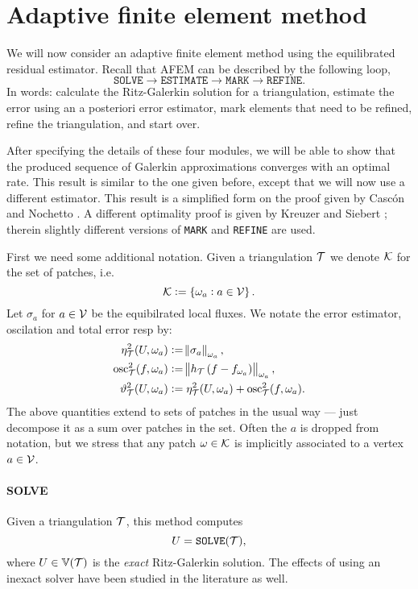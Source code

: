 \documentclass[thesis.tex]{subfiles}
\begin{document}
\section{Adaptive finite element method}
We will now consider an adaptive finite element method using the equilibrated residual estimator.
Recall that AFEM can be described by the following loop,
\[
  \texttt{SOLVE} \to \texttt{ESTIMATE} \to \texttt{MARK} \to \texttt{REFINE}.
\]
In words: calculate the Ritz-Galerkin solution for a triangulation, estimate
the error using an a posteriori error estimator, mark elements that need to be refined, refine
the triangulation, and start over. 

After specifying the details of these four modules, we will be able to show that the produced
sequence of Galerkin approximations converges with an optimal rate. This result
is similar to the one given before, except that we will now use a different estimator. This
result is a simplified form on the proof given by Casc\'on and Nochetto \cite{cascon2012}.
A different optimality proof is given by Kreuzer and Siebert \cite{ainsworthbernstein}; therein
slightly different versions of \texttt{MARK} and \texttt{REFINE} are used.

First we need some additional notation. Given a triangulation $\mathcal{T}$ we denote $\mathcal{K}$ for the set of patches, i.e.
\[
  \mathcal{K} := \set{\omega_a : a \in \mathcal{V}}.
\]
Let $\sigma_a$ for $a \in \mathcal{V}$ be the equibilrated local fluxes. We notate the
  error estimator, oscilation and total error resp by:
\begin{align*}
  \eta^2_{\mathcal{T}}(U, \omega_a) &:= \norm{\sigma_a}_{\omega_a}, \\
  \operatorname{osc}^2_{\mathcal{T}}(f, \omega_a) &:= \norm{h_{\mathcal{T}}\left(f - f_{\omega_a}\right)}_{\omega_a},\\
  \vartheta^2_{\mathcal{T}}(U, \omega_a) &:= \eta^2_{\mathcal{T}}(U, \omega_a) + \operatorname{osc}^2_{\mathcal{T}}(f, \omega_a).
\end{align*}
The above quantities extend to sets of patches in the usual way 
--- just decompose it as a sum over patches in the set.
Often the $a$ is dropped from notation, but we stress that any patch $\omega \in \mathcal{K}$ is implicitly
associated to a vertex $a \in \mathcal{V}$.


\paragraph{SOLVE}Given a triangulation $\mathcal{T}$, this method computes
\[
  U = \texttt{SOLVE}(\mathcal{T}),
\]
where $U \in \mathbb{V}(\mathcal{T})$ is the \emph{exact} Ritz-Galerkin solution. The effects of using an inexact solver have
been studied in the literature as well.
\end{document}
